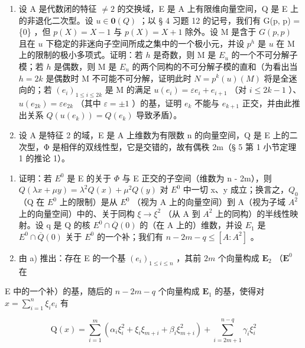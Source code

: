\begin{enumerate}
\def\labelenumi{\arabic{enumi})}
\setcounter{enumi}{25}
\item
  设 A 是代数闭的特征 \(\neq 2\) 的交换域，E 是 A 上有限维向量空间，Q 是 E 上的非退化二次型。设 \(u \in \mathbf{0}(Q)\) ；以 § 4 习题 12 的记号，我们有 G(p, p) = \{0\} ，但 \(p(X) = X - 1\) 与 \(p(X) = X + 1\) 除外。设 M 是含于 \(G(p, p)\) 且在 \(u\) 下稳定的非迷向子空间所成之集中的一个极小元，并设 \(p^h\) 是 \(u\) 在 M 上的限制的极小多项式。证明：若 \(h\) 是奇数，则 M 是 \(E_u\) 的一个不可分解子模；若 \(h\) 是偶数，则 M 是 \(E_u\) 的两个同构的不可分解子模的直和（为看出当 \(h = 2k\) 是偶数时 M 不可能不可分解，证明此时 \(N = p^k(u)(M)\) 将是全迷向的；若 \((e_i)_{1 \leqslant i \leqslant 2k}\) 是 M 的满足 \(u(e_i) = \varepsilon e_i + e_{i+1}\) （对 \(i \leqslant 2k - 1\) ）、\(u(e_{2k}) = \varepsilon e_{2k}\) （其中 \(\varepsilon = \pm 1\) ）的基，证明 \(e_k\) 不能与 \(e_{k+1}\) 正交，并由此推出关系 \(Q(u(e_k)) = Q(e_k)\) 导致矛盾）。
\item
  设 A 是特征 2 的域，E 是 A 上维数为有限数 n 的向量空间，Q 是 E 上的二次型，Φ 是相伴的双线性型，它是交错的，故有偶秩 2m（§ 5 第 1 小节定理 1 的推论 1）。
\end{enumerate}

\begin{enumerate}
\def\labelenumi{\alph{enumi})}
\item
  证明：若 \(E^{0}\) 是 E 的关于 \(\Phi\) 与 E 正交的子空间（维数为 n - 2m），则 \(Q(\lambda x + \mu y) = \lambda^{2}Q(x) + \mu^{2}Q(y)\) 对 \(E^{0}\) 中一切 x、y 成立；换言之，\(Q_{0}\) （Q 在 \(E^{0}\) 上的限制）是从 \(E^{0}\) （视为 A 上的向量空间）到 A（视为子域 \(A^{2}\) 上的向量空间）中的、关于同构 \(\xi \to \xi^{2}\) （从 A 到 \(A^{2}\) 上的同构）的半线性映射。设 q 是 Q 的核 \(E^{0} \cap \overline{Q}(0)\) 的（在 A 上的）维数，并设 \(E_{1}\) 是 \(E^{0} \cap \overline{Q}(0)\) 关于 \(E^{0}\) 的一个补；我们有 \(n - 2m - q \leqslant [A : A^{2}]\) 。
\item
  由 a) 推出：存在 E 的一个基 \((e_i)_{1 \leqslant i \leqslant n}\) ，其前 \(2m\) 个向量构成 \(\mathbf{E}_2\) （\(\mathbf{E}^0\) 在
\end{enumerate}

E 中的一个补）的基，随后的 \(n - 2m - q\) 个向量构成 \(\mathbf{E}_1\) 的基，使得对 \(x = \sum_{i=1}^{n} \xi_i e_i\) 有

\[
\mathrm{Q} (x) = \sum_ {i = 1} ^ {m} \left(\alpha_ {i} \xi_ {i} ^ {2} + \xi_ {i} \xi_ {m + i} + \beta_ {i} \xi_ {m + i} ^ {2}\right) + \sum_ {i = 2 m + 1} ^ {n - q} \gamma_ {i} \xi_ {i} ^ {2}
\]

